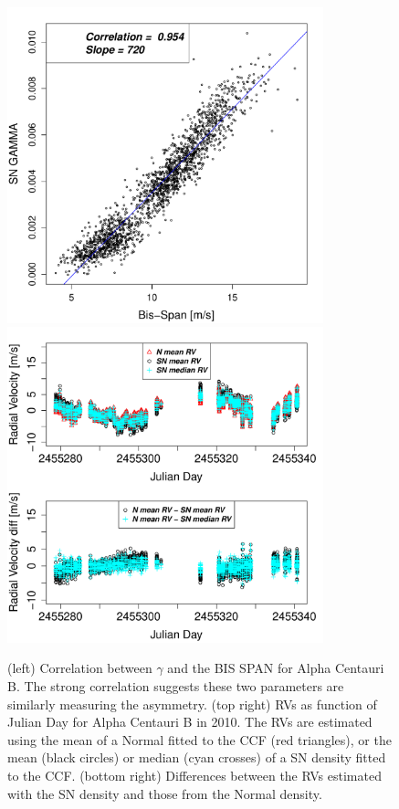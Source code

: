 \documentclass{aa}
\begin{document}
%
\begin{figure}[htbp]
\begin{center}
\includegraphics[height = 3.6in]{HD12862_gamma_vs_bisspan.pdf} 
\includegraphics[height = 3.6in]{HD12862_[2]RadialVelocityDifferences.pdf} 
   \caption{(left) Correlation between $\gamma$ and the BIS SPAN for Alpha Centauri B. The strong correlation suggests these two parameters are similarly measuring the asymmetry.
(top right) RVs as function of Julian Day for Alpha Centauri B in 2010. The RVs are estimated using the mean of a Normal fitted to the CCF (red triangles), or the mean (black circles) or median (cyan crosses) of a SN density fitted to the CCF. (bottom right) Differences between the RVs estimated with the SN density and those from the Normal density.}
   \label{fig:alphacent:corr.gamma}
\end{center}
\end{figure}
%
\end{document}
